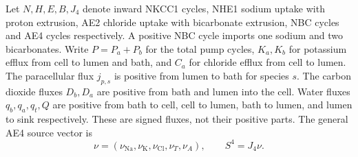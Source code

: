 Let $N,H,E,B,J_4$ denote inward NKCC1 cycles, NHE1 sodium uptake with proton
extrusion, AE2 chloride uptake with bicarbonate extrusion, NBC cycles and
AE4 cycles respectively.  A positive NBC cycle imports one sodium and two
bicarbonates.  Write $P=P_a+P_b$ for the total pump cycles,
$K_a,K_b$ for potassium efflux from cell to lumen and bath, and $C_a$ for
chloride efflux from cell to lumen.  The paracellular flux $j_{p,s}$ is
positive from lumen to bath for species $s$.  The carbon dioxide fluxes
$D_b,D_a$ are positive from bath and lumen into the cell.  Water fluxes
$q_b,q_a,q_t,Q$ are positive from bath to cell, cell to lumen, bath to lumen,
and lumen to sink respectively.  These are signed fluxes, not their positive
parts.  The general AE4 source vector is
\[
 \nu=(\nu_{\mathrm{Na}},\nu_{\mathrm K},\nu_{\mathrm{Cl}},\nu_T,\nu_A),
 \qquad S^4=J_4\nu .
\]

